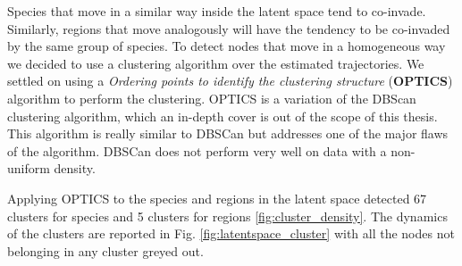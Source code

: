 \documentclass[mscthesis]{usiinfthesis}
\begin{document}
Species that move in a similar way inside the latent space tend to co-invade. Similarly, regions that move analogously will have the tendency to be co-invaded by the same group of species. To detect nodes that move in a homogeneous way we decided to use a clustering algorithm over the estimated trajectories. We settled on using a \textit{Ordering points to identify the clustering structure} (\textbf{OPTICS}) algorithm to perform the clustering. OPTICS is a variation of the DBScan clustering algorithm, which an in-depth cover is out of the scope of this thesis. This algorithm is really similar to DBSCan but addresses one of the major flaws of the algorithm. DBSCan does not perform very well on data with a non-uniform density. 

Applying OPTICS to the species and regions in the latent space detected 67 clusters for species and 5 clusters for regions \ref{fig:cluster_density}. The dynamics of the clusters are reported in Fig. \ref{fig:latentspace_cluster} with all the nodes not belonging in any cluster greyed out. 
\end{document}
